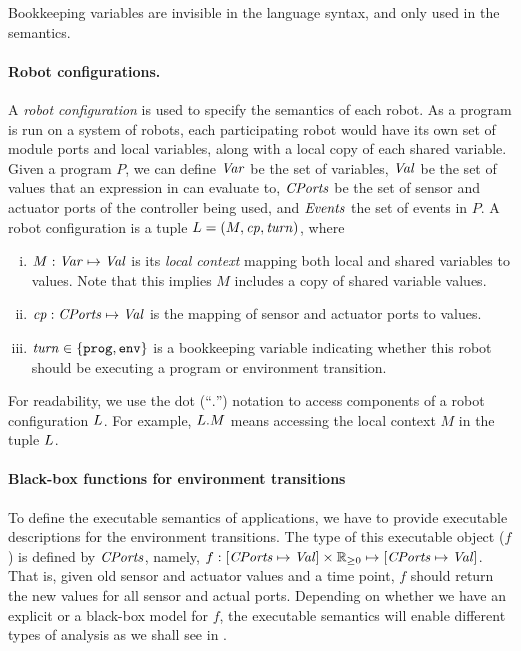 Bookkeeping variables are invisible in the language syntax, and only used in the semantics.


\paragraph{Robot configurations.}

A \emph{robot configuration} is used to specify the semantics of each robot.
As a \lgname program is run on a system of robots,
each participating robot would have its own set of module ports and local variables,
along with a local copy of each shared variable.
Given a \lgname program $P$, we can define $\mathit{Var}$ be the set of variables,
$\mathit{Val}$ be the set of values that an expression in \lgname can evaluate to,
$\mathit{CPorts}$ be the set of sensor and actuator ports of the controller being used,
and $\mathit{Events}$ the set of events in $P$.
A robot configuration is a tuple $L = ({M},\mathit{cp},\mathit{turn})$, where
\vspace{-1mm}
\begin{enumerate}[(i)]
\item ${M} : \mathit{Var} \mapsto \mathit{Val}$ is its \emph{local context} mapping both local and shared variables to values.
      Note that this implies $M$ includes a copy of shared variable values.
\item $\mathit{cp} : \mathit{CPorts} \mapsto \mathit{Val}$ is the mapping of sensor and actuator ports to values.
\item $\mathit{turn} \in \{\mathtt{prog},\mathtt{env}\}$ is a bookkeeping variable indicating whether this robot should be executing a program or environment transition.
\end{enumerate}
\vspace{-1mm}
For readability, we use the dot (``$.$'') notation to access components of a robot configuration $L$.
For example, $L.M$ means accessing the local context $M$ in the tuple $L$.
\vspace{-2mm}
\paragraph{Black-box functions for environment transitions}
To define the  executable \K semantics of  \lgname applications, we have to provide executable descriptions for the environment transitions. The type of this executable object ($f$) is defined by $\mathit{CPorts}$, namely,
$f: [\Cfield \mapsto \Val] \times \nnreals \mapsto [\Cfield \mapsto \Val]$.
That is, given old sensor and actuator values and a time point, $f$ should return the new values for all sensor and actual ports.
%
Depending on whether we have an explicit or a black-box model for $f$,
the executable semantics will enable different types of analysis as we shall see in .


